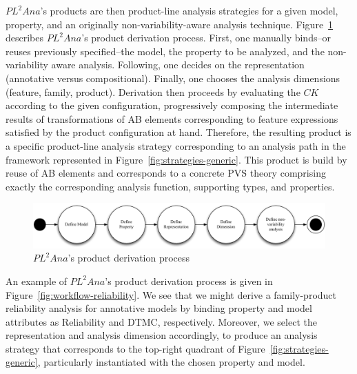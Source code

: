 $PL^{2}Ana$'s products are then product-line analysis strategies for a given model, property, and an originally non-variability-aware analysis technique. Figure~\ref{fig:ad} describes $PL^{2}Ana$'s product derivation process. First, one manually binds--or reuses previously specified--the model, the property to be analyzed, and  the non-variability aware analysis. Following, one decides on the representation (annotative versus compositional). Finally, one chooses the analysis dimensions (feature, family, product). 
Derivation then proceeds by evaluating the $CK$ according to the given configuration, progressively composing the intermediate results of transformations of AB elements corresponding to feature expressions satisfied by the product configuration at hand. Therefore, the resulting product is a specific product-line analysis strategy corresponding to an analysis path in the framework represented in Figure~\ref{fig:strategies-generic}. This product  is build by reuse of AB elements and corresponds to a concrete PVS theory comprising exactly the corresponding analysis function, supporting types, and properties.


\begin{figure}[t]
	\centering
	\includegraphics[width = 0.9\linewidth]{figures/workflow.pdf}
	\caption{$PL^{2}Ana$'s product derivation process}
	\label{fig:ad}
\end{figure}

An example of $PL^{2}Ana$'s product derivation process is given in Figure~\ref{fig:workflow-reliability}. 
We see that we might derive a family-product reliability analysis for annotative models 
by binding property and model attributes as Reliability and DTMC, respectively. 
Moreover, we select the representation and analysis dimension accordingly, 
to produce an analysis strategy that corresponds to the top-right quadrant of Figure~\ref{fig:strategies-generic}, 
particularly instantiated with the chosen property and model. 


